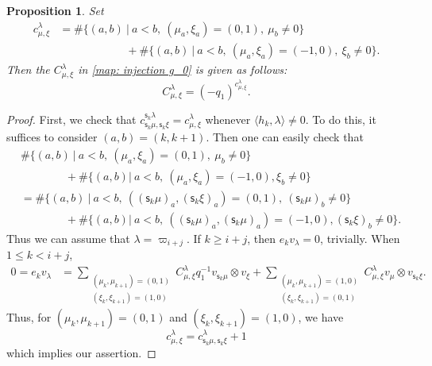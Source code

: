\documentclass[11pt, leqno]{amsart}
\newtheorem{proposition}[theorem]{Proposition}
\theoremstyle{definition}
\numberwithin{equation}{section}
\begin{document}
\begin{proposition}\label{prop: c}
Set
\begin{equation} \label{eq: coeff c}
\begin{aligned}c_{\mu,\xi}^{\lambda} & = \# \{ (a,b) \ | \ a<b, \
(\mu_a,\xi_a)=(0,1), \ \mu_b \neq 0 \} \\
& \qquad \qquad \qquad + \# \{ (a,b) \ | \ a<b, \
(\mu_a,\xi_a)=(-1,0), \ \xi_b \ne 0 \}.
\end{aligned}
\end{equation}
Then the $C_{\mu,\xi}^{\lambda}$ in \eqref{map: injection g_0} is given as follows:
$$C_{\mu,\xi}^{\lambda} =(-q_1)^{c_{\mu,\xi}^{\lambda}}.$$
\end{proposition}
\begin{proof}
First, we check that
$c_{{\mathsf{s}}_k\mu,{\mathsf{s}}_k\xi}^{{\mathsf{s}}_k\lambda}=c_{\mu,\xi}^{\lambda}$ whenever
$\langle h_k,\lambda \rangle \neq 0$. To do this, it suffices to
consider $(a,b)=(k,k+1)$. Then one can easily check that
\begin{align*}& \# \{ (a,b) \ | \ a<b, \
(\mu_a,\xi_a)=(0,1), \ \mu_b\ne 0 \} \\ & \qquad\qquad + \# \{ (a,b)
| \
a<b, \ (\mu_a,\xi_a)=(-1,0), \xi_b\ne 0 \} \\
&= \# \{ (a,b) \ | \ a<b, \ (({\mathsf{s}}_k\mu)_a,({\mathsf{s}}_k\xi)_a)=(0,1), \
({\mathsf{s}}_k\mu)_b\ne 0 \} \\ & \qquad\qquad + \# \{ (a,b) | \ a<b, \
(({\mathsf{s}}_k\mu)_a,({\mathsf{s}}_k\mu)_a)=(-1,0), ({\mathsf{s}}_k\xi)_b\ne 0 \}.
\end{align*}
Thus we can assume that $\lambda={\varpi}_{i+j}$.  If $k  \ge i+j$, then
$e_k v_\lambda= 0$, trivially.  When $1 \le k < i+j$,
\begin{align*}
0=e_k v_\lambda & = \sum_{\substack{ (\mu_k,\mu_{k+1})=(0,1) \\
(\xi_k,\xi_{k+1})=(1,0)}} C_{\mu,\xi}^{\lambda}q_1^{-1} v_{{\mathsf{s}}_k\mu}
\otimes v_{\xi} + \sum_{\substack{ (\mu_k,\mu_{k+1})=(1,0) \\
(\xi_k,\xi_{k+1})=(0,1)}} C_{\mu,\xi}^{\lambda} v_{\mu} \otimes
v_{{\mathsf{s}}_k\xi}.
\end{align*}
Thus, for $(\mu_k,\mu_{k+1})=(0,1) $ and $(\xi_k,\xi_{k+1})=(1,0)$,
we have
$$ c_{\mu,\xi}^{\lambda} = c_{{\mathsf{s}}_k\mu,{\mathsf{s}}_k\xi}^{\lambda} +1 $$
which implies our assertion.
\end{proof}
\end{document}
